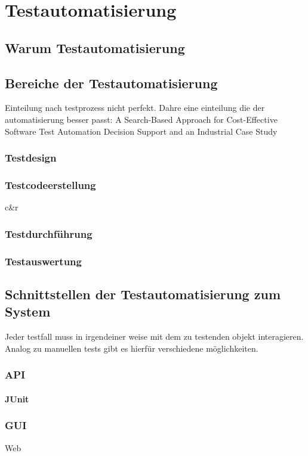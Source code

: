 \chapter{Testautomatisierung}
\label{sec:testautomatisierung}


\section{Warum Testautomatisierung}
\label{sec:warum_testautomatisierung}



\section{Bereiche der Testautomatisierung}
\label{sec:bereiche_der_estautomatisierung}
Einteilung nach testprozess nicht perfekt. Dahre eine einteilung die der automatisierung besser passt:
A Search-Based Approach for Cost-Effective Software Test Automation Decision Support and an Industrial Case Study

\subsection{Testdesign}
\label{subsec:testdesign}


\subsection{Testcodeerstellung}
\label{subsec:testcodeerstellung}
c&r

\subsection{Testdurchführung}
\label{subsec:testdurchführung}


\subsection{Testauswertung}
\label{subsec:testauswertung}



\section{Schnittstellen der Testautomatisierung zum System}
\label{sec:schnittstellen_der_testautomatisierung_zum_syste}

Jeder testfall muss in irgendeiner weise mit dem zu testenden objekt interagieren.
Analog zu manuellen tests gibt es hierfür verschiedene möglichkeiten.
\subsection{API}
\subsubsection{JUnit}
\label{sec:junit}

\subsection{GUI}
Web
